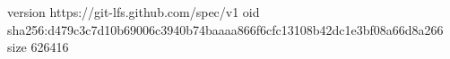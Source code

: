 version https://git-lfs.github.com/spec/v1
oid sha256:d479c3c7d10b69006c3940b74baaaa866f6cfc13108b42dc1e3bf08a66d8a266
size 626416
